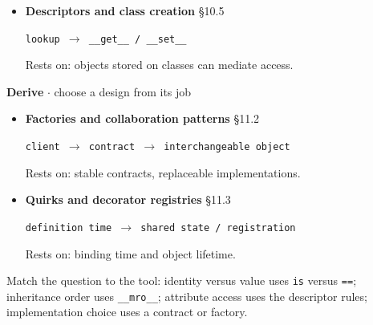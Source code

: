 \documentclass[11pt]{article}
\begin{document}
\begin{keepsection}
\begin{itemize}
\texttt{class + merge(parent MROs, bases)}

Rests on: ordered, monotonic inheritance.
\item {}
\textbf{Descriptors and class creation} \hfill{\small\color{FAUblue}§10.5}

\texttt{lookup \ensuremath{\to} \_\_get\_\_ / \_\_set\_\_}

Rests on: objects stored on classes can mediate access.
\end{itemize}

\textbf{Derive} \ensuremath{\cdot} choose a design from its job

\begin{itemize}
\item {}
\textbf{Factories and collaboration patterns} \hfill{\small\color{FAUblue}§11.2}

\texttt{client \ensuremath{\to} contract \ensuremath{\to} interchangeable object}

Rests on: stable contracts, replaceable implementations.
\item {}
\textbf{Quirks and decorator registries} \hfill{\small\color{FAUblue}§11.3}

\texttt{definition time \ensuremath{\to} shared state / registration}

Rests on: binding time and object lifetime.
\end{itemize}

Match the question to the tool: identity versus value uses \texttt{is} versus \texttt{==}; inheritance order uses \texttt{\_\_mro\_\_}; attribute access uses the descriptor rules; implementation choice uses a contract or factory.
\end{keepsection}
\end{document}
